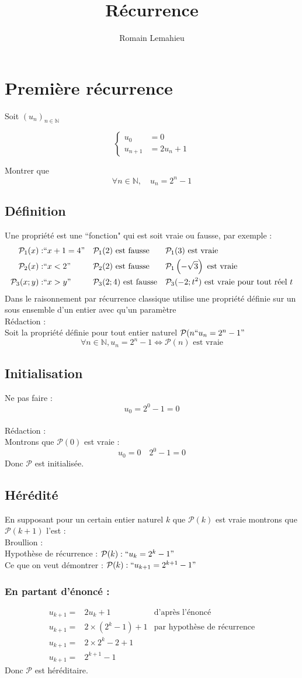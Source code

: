 \documentclass{exam}
\title{Récurrence}
\author{Romain Lemahieu}
\newcommand*{\p}{\mathcal{P}}
\newcommand*{\n}{\mathbb{N}}
\newcommand*{\sys}[1]{
$$
\begin{cases}
#1
\end{cases}
$$
}
\begin{document}
\maketitle
\section{Première récurrence}
Soit $(u_n)_{n \in \n}$ 
\sys{
  u_0&=0\\
  u_{n+1}&=2u_n+1
}
Montrer que
$$
\forall n\in\n,
\quad
u_n=2^n-1
$$
\subsection{Définition}
Une propriété est une ``fonction" qui est soit vraie ou fausse, par exemple :
\begin{align*}
\p_1(x):&``x+1=4"
&&
\p_1(2)
\text{ est fausse}
&&
\p_1(3)
\text{ est vraie}
\\
\p_2(x):&``x<2"
&&
\p_2(2)
\text{ est fausse}
&&
\p_1\left(-\sqrt{3}\right)
\text{ est vraie}
\\
\p_3(x;y):&``x>y"
&&
\p_3(2;4)
\text{ est fausse}
&&
\p_3(-2;t^2)
\text{ est vraie pour tout réel }t
\end{align*}
Dans le raisonnement par récurrence classique utilise une propriété définie
sur un sous ensemble d'un entier avec qu'un paramètre
\\
Rédaction : 
\\
Soit la propriété définie pour tout entier naturel
$\p(n``u_n=2^n-1"$
$$
\forall n\in\n,
u_n=2^n-1
\Leftrightarrow
\p(n) \text{ est vraie}
$$
\subsection{Initialisation}
Ne pas faire :
$$
u_0=2^0-1=0
$$
\\
Rédaction :
\\
Montrons que $\p(0)$ est vraie :
$$
u_0=0 \quad 2^0-1=0
$$
Donc $\p$ est initialisée.
\subsection{Hérédité}
En supposant pour un certain entier naturel $k$ que $\p(k)$ est vraie
montrons que $\p(k+1)$ l'est :
\\
Broullion :
\\
Hypothèse de récurrence : $\p(k):``u_k=2^k-1"$
\\
Ce que on veut démontrer : $\p(k):``u_{k+1}=2^{k+1}-1"$

\subsubsection{En partant d'énoncé :}
\begin{align*}
u_{k+1}=&2u_k+1
&
\text{d'après l'énoncé}
\\
u_{k+1}=&2\times(2^k-1)+1
&
\text{par hypothèse de récurrence}
\\
u_{k+1}=&2\times2^k-2+1
\\
u_{k+1}=&2^{k+1}-1
\end{align*}
Donc $\p$ est héréditaire.
\end{document}
